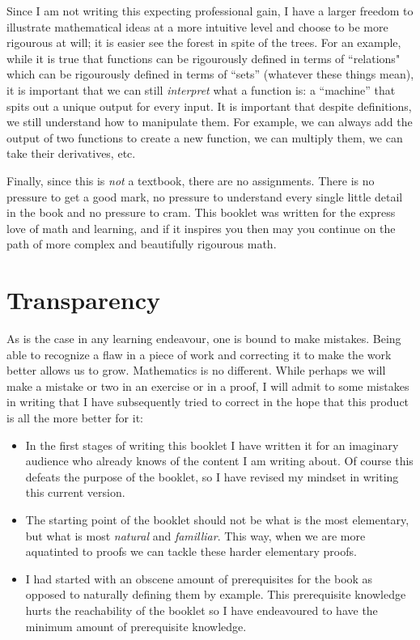 \documentclass[../proofs.tex]{subfiles}
\begin{document}
Since I am not writing this expecting professional gain, I have a larger freedom to illustrate 
mathematical ideas at a more intuitive level and choose to be more rigourous at will; it is easier
see the forest in spite of the trees. For an example, while it is true that functions can be
rigourously defined in terms of ``relations" which can be rigourously defined in terms of ``sets''
(whatever these things mean), it is important that we can still \emph{interpret} what a function
is: a ``machine'' that spits out a unique output for every input. It is important that despite
definitions, we still understand how to manipulate them. For example, we can always add the output
of two functions to create a new function, we can multiply them, we can take their derivatives,
etc.


Finally, since this is \emph{not} a textbook, there are no assignments. There is no pressure to
get a good mark, no pressure to understand every single little detail in the book and no pressure
to cram. This booklet was written for the express love of math and learning, and if it inspires you
then may you continue on the path of more complex and beautifully rigourous math.

\section{Transparency}
As is the case in any learning endeavour, one is bound to make mistakes. Being able to recognize
a flaw in a piece of work and correcting it to make the work better allows us to grow. Mathematics
is no different. While perhaps we will make a mistake or two in an exercise or in a proof, I will
admit to some mistakes in writing that I have subsequently tried to correct in the hope that this
product is all the more better for it:

\begin{itemize}
  \item In the first stages of writing this booklet I have written it for an imaginary audience
  who already knows of the content I am writing about. Of course this defeats the purpose of the
  booklet, so I have revised my mindset in writing this current version.

  \item The starting point of the booklet should not be what is the most elementary, but what is
  most \emph{natural} and \emph{familliar}. This way, when we are more aquatinted to proofs we can
  tackle these harder elementary proofs.

  \item I had started with an obscene amount of prerequisites for the book as opposed to naturally
  defining them by example. This prerequisite knowledge hurts the reachability of the booklet
  so I have endeavoured to have the minimum amount of prerequisite knowledge.
\end{itemize}
\end{document}
